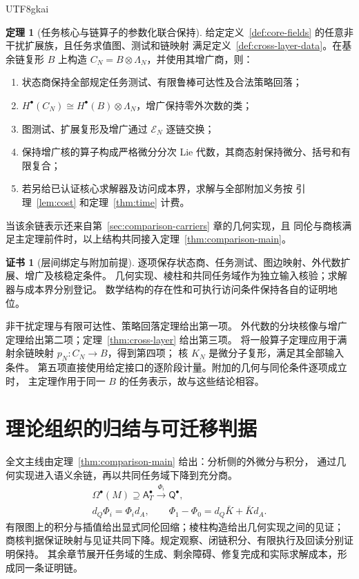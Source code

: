 \documentclass[12pt]{report}
\makeatletter
\theoremstyle{definition}
\newtheorem{theorem}{定理}[chapter]
\newtheorem{Certificate}{证书}[chapter]
\renewenvironment{proof}[1][\proofname]{\par
  \pushQED{\qed}\normalfont
  \topsep6\p@\@plus6\p@\relax
  \trivlist
  \item[\hskip\labelsep\normalfont #1\@addpunct{.}]\ignorespaces
}{
  \popQED\endtrivlist\@endpefalse
}
\makeatother
\begin{document}
\begin{CJK*}{UTF8}{gkai}
\begin{theorem}[任务核心与链算子的参数化联合保持]
\label{thm:general-realization}
给定定义~\ref{def:core-fields} 的任意非干扰扩展族，且任务求值图、测试和链映射
满足定义~\ref{def:cross-layer-data}。在基余链复形 \(B\) 上构造
\(C_N=B\otimes\Lambda_N\)，并使用其增广商，则：
\begin{enumerate}
\item 状态商保持全部规定任务测试、有限鲁棒可达性及合法策略回落；
\item \(H^\bullet(C_N)\cong H^\bullet(B)\otimes\Lambda_N\)，增广保持零外次数的类；
\item 图测试、扩展复形及增广通过 \(\mathcal E_N\) 逐链交换；
\item 保持增广核的算子构成严格微分分次 Lie 代数，其商态射保持微分、括号和有限复合；
\item 若另给已认证核心求解器及访问成本界，求解与全部附加义务按
引理~\ref{lem:cost} 和定理~\ref{thm:time} 计费。
\end{enumerate}
当该余链表示还来自第~\ref{sec:comparison-carriers} 章的几何实现，且
同伦与商核满足主定理前件时，以上结构共同接入定理~\ref{thm:comparison-main}。
\end{theorem}
\begin{Certificate}[层间绑定与附加前提]
逐项保存状态商、任务测试、图边映射、外代数扩展、增广及核稳定条件。
几何实现、棱柱和共同任务域作为独立输入核验；求解器与成本界分别登记。
数学结构的存在性和可执行访问条件保持各自的证明地位。
\end{Certificate}
\begin{proof}
非干扰定理与有限可达性、策略回落定理给出第一项。
外代数的分块核像与增广定理给出第二项；定理~\ref{thm:cross-layer} 给出第三项。
将一般算子定理应用于满射余链映射 \(p_N:C_N\to B\)，得到第四项；
核 \(K_N\) 是微分子复形，满足其全部输入条件。
第五项直接使用给定接口的逐阶段计量。附加的几何与同伦条件逐项成立时，
主定理作用于同一 \(B\) 的任务表示，故与这些结论相容。
\end{proof}


\section{理论组织的归结与可迁移判据}
全文主线由定理~\ref{thm:comparison-main} 给出：分析侧的外微分与积分，
通过几何实现进入语义余链，再以共同任务域下降到充分商。
\[
\begin{gathered}
\Omega^\bullet(M)\supseteq\mathsf A_T^\bullet
\xrightarrow{\Phi_i}\mathsf Q^\bullet,\\
d_Q\Phi_i=\Phi_i d_A,\qquad
\Phi_1-\Phi_0=d_Q\bar K+\bar Kd_A.
\end{gathered}
\]
有限图上的积分与插值给出显式同伦回缩；棱柱构造给出几何实现之间的见证；
商核判据保证映射与见证共同下降。规定观察、闭链积分、有限执行及回读分别证明保持。
其余章节展开任务域的生成、剩余障碍、修复完成和实际求解成本，形成同一条证明链。


\end{CJK*}
\end{document}
